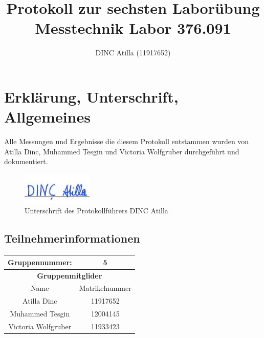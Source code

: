 \documentclass[a4paper]{article}
\title{Protokoll zur sechsten Laborübung\\Messtechnik Labor 376.091}
\author{DINC Atilla (11917652)}
\begin{document}
\newcommand{\unit}[1]{\ensuremath{\, \mathrm{#1}}} %
\pagestyle{fancy}
\fancyfoot[C]{\textbf{\thepage /\pageref{LastPage}}}
\renewcommand{\footrulewidth}{0.4pt}

\normalsize
\maketitle
\tableofcontents
\pagebreak
\section{Erklärung, Unterschrift, Allgemeines}
Alle Messungen und Ergebnisse die diesem Protokoll entstammen wurden von Atilla Dinc,
Muhammed Tesgin und Victoria Wolfgruber durchgeführt und dokumentiert.

\begin{figure}[h]
    \centering
    \includegraphics[width=0.3\textwidth]{images/Unterschrift}
    \caption{Unterschrift des Protokollführers DINC Atilla}
\end{figure}

\subsection{Teilnehmerinformationen}
	\begin{tabular}{|c| c|}
		\hline
        \textbf{Gruppennummer:} & 5                                                                                        \\
        \hline
		\multicolumn{2}{|c|}{\textbf{Gruppenmitglider}}                                                                                        \\
		\hline
        Name & Matrikelnummer\\
        \hline
        Atilla Dinc & 11917652\\
        Muhammed Tesgin & 12004145\\
        Victoria Wolfgruber & 11933423\\
        \hline
	\end{tabular}
\end{document}
